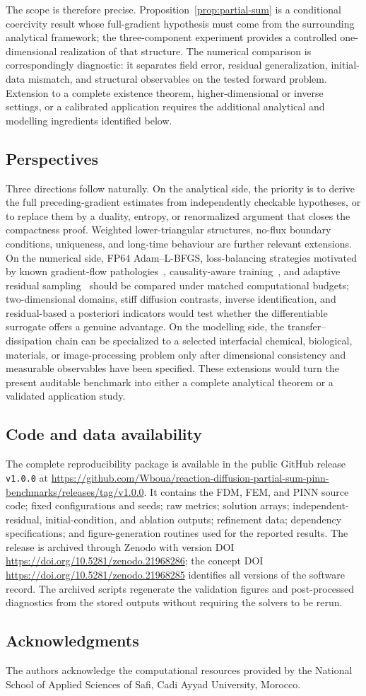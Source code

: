 The scope is therefore precise. Proposition~\ref{prop:partial-sum} is a conditional coercivity result whose full-gradient hypothesis must come from the surrounding analytical framework; the three-component experiment provides a controlled one-dimensional realization of that structure. The numerical comparison is correspondingly diagnostic: it separates field error, residual generalization, initial-data mismatch, and structural observables on the tested forward problem. Extension to a complete existence theorem, higher-dimensional or inverse settings, or a calibrated application requires the additional analytical and modelling ingredients identified below.

\subsection*{Perspectives}

Three directions follow naturally. On the analytical side, the priority is to derive the full preceding-gradient estimates from independently checkable hypotheses, or to replace them by a duality, entropy, or renormalized argument that closes the compactness proof. Weighted lower-triangular structures, no-flux boundary conditions, uniqueness, and long-time behaviour are further relevant extensions. On the numerical side, FP64 Adam--L-BFGS, loss-balancing strategies motivated by known gradient-flow pathologies~\cite{wang2021gradient,wang2022ntk}, causality-aware training~\cite{wang2024causality}, and adaptive residual sampling~\cite{wu2023sampling} should be compared under matched computational budgets; two-dimensional domains, stiff diffusion contrasts, inverse identification, and residual-based a posteriori indicators would test whether the differentiable surrogate offers a genuine advantage. On the modelling side, the transfer--dissipation chain can be specialized to a selected interfacial chemical, biological, materials, or image-processing problem only after dimensional consistency and measurable observables have been specified. These extensions would turn the present auditable benchmark into either a complete analytical theorem or a validated application study.

\subsection*{Code and data availability}
The complete reproducibility package is available in the public GitHub release \texttt{v1.0.0} at \url{https://github.com/Wboua/reaction-diffusion-partial-sum-pinn-benchmarks/releases/tag/v1.0.0}. It contains the FDM, FEM, and PINN source code; fixed configurations and seeds; raw metrics; solution arrays; independent-residual, initial-condition, and ablation outputs; refinement data; dependency specifications; and figure-generation routines used for the reported results. The release is archived through Zenodo with version DOI \url{https://doi.org/10.5281/zenodo.21968286}; the concept DOI \url{https://doi.org/10.5281/zenodo.21968285} identifies all versions of the software record. The archived scripts regenerate the validation figures and post-processed diagnostics from the stored outputs without requiring the solvers to be rerun.

\subsection*{Acknowledgments}
The authors acknowledge the computational resources provided by the National School of Applied Sciences of Safi, Cadi Ayyad University, Morocco.

